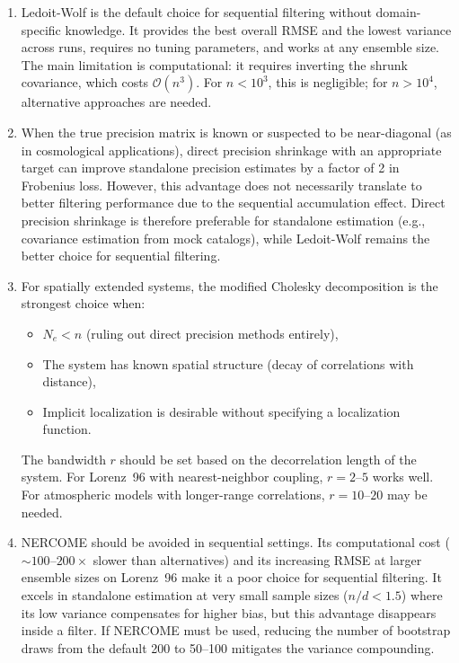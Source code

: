 \begin{enumerate}
\item Ledoit-Wolf is the default choice for sequential filtering without domain-specific knowledge. It provides the best overall RMSE and the lowest variance across runs, requires no tuning parameters, and works at any ensemble size. The main limitation is computational: it requires inverting the shrunk covariance, which costs $\mathcal{O}(n^3)$. For $n < 10^3$, this is negligible; for $n > 10^4$, alternative approaches are needed.

\item When the true precision matrix is known or suspected to be near-diagonal (as in cosmological applications), direct precision shrinkage with an appropriate target can improve standalone precision estimates by a factor of 2 in Frobenius loss. However, this advantage does not necessarily translate to better filtering performance due to the sequential accumulation effect. Direct precision shrinkage is therefore preferable for standalone estimation (e.g., covariance estimation from mock catalogs), while Ledoit-Wolf remains the better choice for sequential filtering.

\item For spatially extended systems, the modified Cholesky decomposition is the strongest choice when:
\begin{itemize}
    \item $N_e < n$ (ruling out direct precision methods entirely),
    \item The system has known spatial structure (decay of correlations with distance),
    \item Implicit localization is desirable without specifying a localization function.
\end{itemize}
The bandwidth $r$ should be set based on the decorrelation length of the system. For Lorenz~96 with nearest-neighbor coupling, $r = 2$--$5$ works well. For atmospheric models with longer-range correlations, $r = 10$--$20$ may be needed.

\item NERCOME should be avoided in sequential settings. Its computational cost ($\sim 100$--$200\times$ slower than alternatives) and its increasing RMSE at larger ensemble sizes on Lorenz~96 make it a poor choice for sequential filtering. It excels in standalone estimation at very small sample sizes ($n/d < 1.5$) where its low variance compensates for higher bias, but this advantage disappears inside a filter. If NERCOME must be used, reducing the number of bootstrap draws from the default 200 to 50--100 mitigates the variance compounding.


\end{enumerate}
